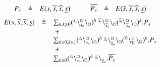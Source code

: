 \[
\begin{array}{lcl@{\hskip 1cm}lcl}
 P_s &\defeq & E(s,\widetilde{s},\widehat{s},\underline{s}) 
 &
 \overline{P_s}& \defeq & E(\overline{s},\widetilde{s},\widehat{s},\underline{s})
\end{array}
\]
%
\[
\begin{array}{rcl}
 E(s,\widetilde{s},\widehat{s},\underline{s}) & \defeq &\sum_{h,k\geq 0}  
  (\startchain{s_i}\chainedlink{s_o}{\noact}\chainend{\noact})^h \ \startchain{\widehat{s}_i}\chainedlink{\widehat{s}_o}{\noact}\chainend{\noact} (\startchain{\widetilde{s}_i}\chainedlink{\widetilde{s}_o}{\noact}\chainend{\noact})^k.P_s\\
&&\ + \\
&&
\sum_{h\geq 0,k\geq 1}
 (\startchain{s_i}\chainedlink{s_o}{\noact}\chainend{\noact})^h \ \startchain{\underline{s}_i}\chainedlink{\underline{s}_o}{\noact}\chainend{\noact}(\startchain{\widetilde{s}_i}\chainedlink{\widetilde{s}_o}{\noact}\chainend{\noact})^k.P_s\\
&&\ +\\
&&\sum_{h\geq 0}(\startchain{s_i}\chainedlink{s_o}{\noact}\chainend{\noact})^h \ \link{\underline{s}_i}{\underline{s}_o}.\overline{P_s}
\end{array}
\]
